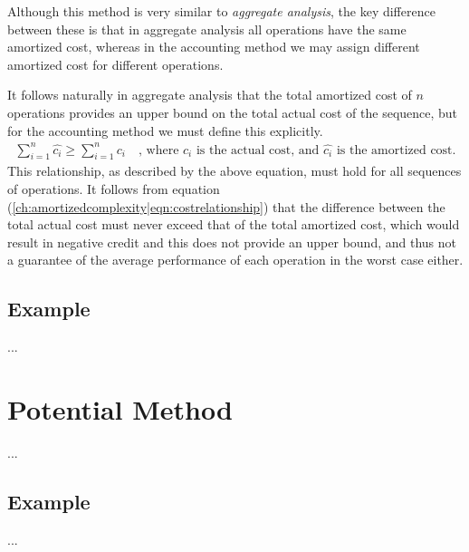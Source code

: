 Although this method is very similar to \textit{aggregate analysis}, the key
difference between these is that in aggregate analysis all operations have
the same amortized cost, whereas in the accounting method we may assign
different amortized cost for different operations.

It follows naturally in aggregate analysis that the total amortized cost of
$n$ operations provides an upper bound on the total actual cost of the
sequence, but for the accounting method we must define this explicitly.
\begin{align}
\label{ch:amortizedcomplexity|eqn:costrelationship}
	\sum_{i=1}^{n}{\hat{c_i}} \geq \sum_{i=1}^{n}{c_i}
	\quad \text{, where }c_i\text{ is the actual cost, and }
	\hat{c_i}\text{ is the amortized cost.}
\end{align}
This relationship, as described by the above equation, must hold for all
sequences of operations. It follows from equation
(\ref{ch:amortizedcomplexity|eqn:costrelationship}) that the difference
between the total actual cost must never exceed that of the total amortized
cost, which would result in negative credit and this does not provide an upper
bound, and thus not a guarantee of the average performance of each operation
in the worst case either.

\subsection{Example}
...

\section{Potential Method}
...

\subsection{Example}
...

